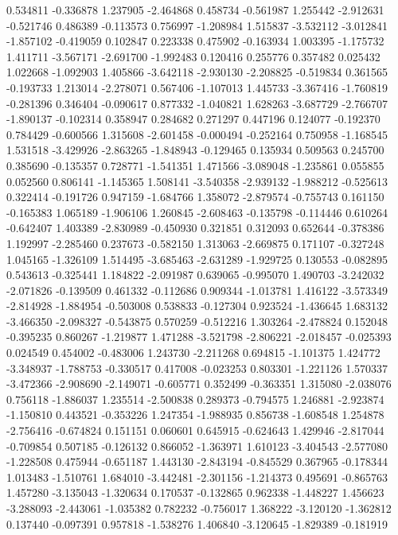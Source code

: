 0.534811
-0.336878
1.237905
-2.464868
0.458734
-0.561987
1.255442
-2.912631
-0.521746
0.486389
-0.113573
0.756997
-1.208984
1.515837
-3.532112
-3.012841
-1.857102
-0.419059
0.102847
0.223338
0.475902
-0.163934
1.003395
-1.175732
1.411711
-3.567171
-2.691700
-1.992483
0.120416
0.255776
0.357482
0.025432
1.022668
-1.092903
1.405866
-3.642118
-2.930130
-2.208825
-0.519834
0.361565
-0.193733
1.213014
-2.278071
0.567406
-1.107013
1.445733
-3.367416
-1.760819
-0.281396
0.346404
-0.090617
0.877332
-1.040821
1.628263
-3.687729
-2.766707
-1.890137
-0.102314
0.358947
0.284682
0.271297
0.447196
0.124077
-0.192370
0.784429
-0.600566
1.315608
-2.601458
-0.000494
-0.252164
0.750958
-1.168545
1.531518
-3.429926
-2.863265
-1.848943
-0.129465
0.135934
0.509563
0.245700
0.385690
-0.135357
0.728771
-1.541351
1.471566
-3.089048
-1.235861
0.055855
0.052560
0.806141
-1.145365
1.508141
-3.540358
-2.939132
-1.988212
-0.525613
0.322414
-0.191726
0.947159
-1.684766
1.358072
-2.879574
-0.755743
0.161150
-0.165383
1.065189
-1.906106
1.260845
-2.608463
-0.135798
-0.114446
0.610264
-0.642407
1.403389
-2.830989
-0.450930
0.321851
0.312093
0.652644
-0.378386
1.192997
-2.285460
0.237673
-0.582150
1.313063
-2.669875
0.171107
-0.327248
1.045165
-1.326109
1.514495
-3.685463
-2.631289
-1.929725
0.130553
-0.082895
0.543613
-0.325441
1.184822
-2.091987
0.639065
-0.995070
1.490703
-3.242032
-2.071826
-0.139509
0.461332
-0.112686
0.909344
-1.013781
1.416122
-3.573349
-2.814928
-1.884954
-0.503008
0.538833
-0.127304
0.923524
-1.436645
1.683132
-3.466350
-2.098327
-0.543875
0.570259
-0.512216
1.303264
-2.478824
0.152048
-0.395235
0.860267
-1.219877
1.471288
-3.521798
-2.806221
-2.018457
-0.025393
0.024549
0.454002
-0.483006
1.243730
-2.211268
0.694815
-1.101375
1.424772
-3.348937
-1.788753
-0.330517
0.417008
-0.023253
0.803301
-1.221126
1.570337
-3.472366
-2.908690
-2.149071
-0.605771
0.352499
-0.363351
1.315080
-2.038076
0.756118
-1.886037
1.235514
-2.500838
0.289373
-0.794575
1.246881
-2.923874
-1.150810
0.443521
-0.353226
1.247354
-1.988935
0.856738
-1.608548
1.254878
-2.756416
-0.674824
0.151151
0.060601
0.645915
-0.624643
1.429946
-2.817044
-0.709854
0.507185
-0.126132
0.866052
-1.363971
1.610123
-3.404543
-2.577080
-1.228508
0.475944
-0.651187
1.443130
-2.843194
-0.845529
0.367965
-0.178344
1.013483
-1.510761
1.684010
-3.442481
-2.301156
-1.214373
0.495691
-0.865763
1.457280
-3.135043
-1.320634
0.170537
-0.132865
0.962338
-1.448227
1.456623
-3.288093
-2.443061
-1.035382
0.782232
-0.756017
1.368222
-3.120120
-1.362812
0.137440
-0.097391
0.957818
-1.538276
1.406840
-3.120645
-1.829389
-0.181919
